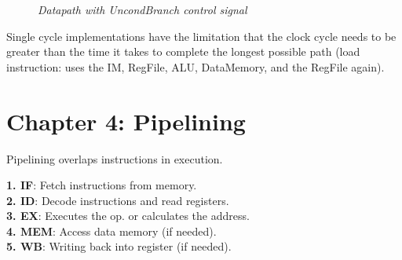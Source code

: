 \documentclass[11pt]{article}
\begin{document}
\begin{figure}[htbp]
    \centering
    \caption{\textit{Datapath with UncondBranch control signal}}
\end{figure}

Single cycle implementations have the limitation that the clock cycle needs to be greater than the time it takes to complete the longest possible path (load instruction: uses the IM, RegFile, ALU, DataMemory, and the RegFile again).

\pagebreak

\section*{Chapter 4: Pipelining}

Pipelining overlaps instructions in execution.

\label{jmp:five-stages}
\begin{tcolorbox}[
    enhanced,
    attach boxed title to top left={xshift=6mm,yshift=-1.5mm},
    colback=moonstoneblue!20,
    colframe=moonstoneblue,
    colbacktitle=moonstoneblue,
    title=LEGv8 Pipelining Steps,
    fonttitle=\bfseries\color{white},
    boxed title style={size=small,colframe=moonstoneblue,sharp corners},
    sharp corners,
    label=box:logic-types,
]
    {\color{moondark}\textbf{1. IF}}: Fetch instructions from memory. \\
    {\color{moondark}\textbf{2. ID}}: Decode instructions and read registers.\\
    {\color{moondark}\textbf{3. EX}}: Executes the op. or calculates the address.\\
    {\color{moondark}\textbf{4. MEM}}: Access data memory (if needed).\\
    {\color{moondark}\textbf{5. WB}}: Writing back into register (if needed).
\end{tcolorbox}
\end{document}
